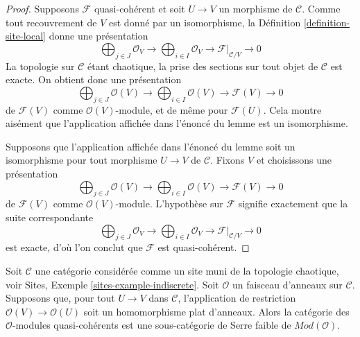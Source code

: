 \begin{proof}
Supposons $\mathcal{F}$ quasi-cohérent et soit $U \to V$ un morphisme de
$\mathcal{C}$. Comme tout recouvrement de $V$ est donné par un isomorphisme,
la Définition \ref{definition-site-local} donne une présentation
$$
\bigoplus\nolimits_{j \in J} \mathcal{O}_V \longrightarrow
\bigoplus\nolimits_{i \in I} \mathcal{O}_V \longrightarrow
\mathcal{F}|_{\mathcal{C}/V} \longrightarrow 0
$$
La topologie sur $\mathcal{C}$ étant chaotique, la prise des sections sur
tout objet de $\mathcal{C}$ est exacte. On obtient donc une présentation
$$
\bigoplus\nolimits_{j \in J} \mathcal{O}(V) \longrightarrow
\bigoplus\nolimits_{i \in I} \mathcal{O}(V) \longrightarrow
\mathcal{F}(V) \longrightarrow 0
$$
de $\mathcal{F}(V)$ comme $\mathcal{O}(V)$-module, et de même pour
$\mathcal{F}(U)$. Cela montre aisément que l'application affichée dans
l'énoncé du lemme est un isomorphisme.

\medskip\noindent
Supposons que l'application affichée dans l'énoncé du lemme soit un
isomorphisme pour tout morphisme $U \to V$ de $\mathcal{C}$. Fixons $V$ et
choisissons une présentation
$$
\bigoplus\nolimits_{j \in J} \mathcal{O}(V) \longrightarrow
\bigoplus\nolimits_{i \in I} \mathcal{O}(V) \longrightarrow
\mathcal{F}(V) \longrightarrow 0
$$
de $\mathcal{F}(V)$ comme $\mathcal{O}(V)$-module. L'hypothèse sur
$\mathcal{F}$ signifie exactement que la suite correspondante
$$
\bigoplus\nolimits_{j \in J} \mathcal{O}_V \longrightarrow
\bigoplus\nolimits_{i \in I} \mathcal{O}_V \longrightarrow
\mathcal{F}|_{\mathcal{C}/V} \longrightarrow 0
$$
est exacte, d'où l'on conclut que $\mathcal{F}$ est quasi-cohérent.
\end{proof}

\begin{lemma}
\label{lemma-chaotic-flat-quasi-coherent}
Soit $\mathcal{C}$ une catégorie considérée comme un site muni de la
topologie chaotique, voir Sites, Exemple \ref{sites-example-indiscrete}.
Soit $\mathcal{O}$ un faisceau d'anneaux sur $\mathcal{C}$.
Supposons que, pour tout $U \to V$ dans $\mathcal{C}$, l'application de
restriction $\mathcal{O}(V) \to \mathcal{O}(U)$ soit un homomorphisme plat
d'anneaux. Alors la catégorie des $\mathcal{O}$-modules quasi-cohérents est
une sous-catégorie de Serre faible de $\textit{Mod}(\mathcal{O})$.
\end{lemma}

